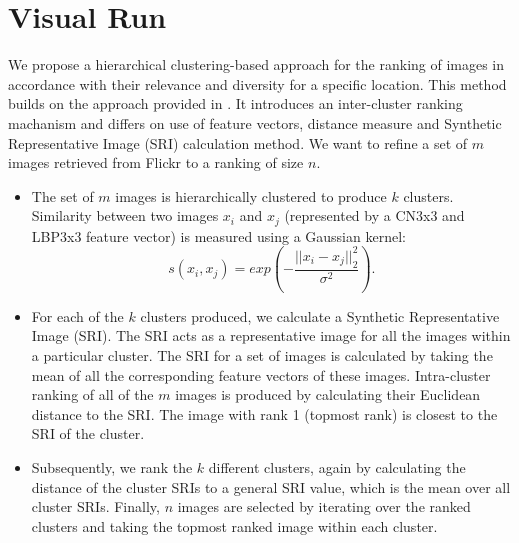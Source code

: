\documentclass{acm_proc_article-me11_tweaked}
\begin{document}
\section{Visual Run}
\label{visual-similarity}
We propose a hierarchical clustering-based approach for the ranking of images in accordance with their relevance and diversity for a specific location. 
This method builds on the approach provided in \cite{representativeness}.
It introduces an inter-cluster ranking machanism and differs on use of feature vectors, distance measure and Synthetic Representative Image (SRI) calculation method.
We want to refine a set of $m$ images retrieved from Flickr to a ranking of size $n$.
\begin{itemize}[leftmargin=*]
 \item The set of $m$ images is hierarchically clustered to produce $k$ clusters. Similarity between two images $x_i$ and $x_j$ (represented by a CN3x3 and LBP3x3 feature vector) is measured using a Gaussian kernel:
 \begin{equation}
 \label{gaussian-similarity}
s(x_i, x_j) = exp\left(-\frac{||x_i - x_j||_2^2}{\sigma^2}\right).
 \end{equation}
 
 \item For each of the $k$ clusters produced, we calculate a Synthetic Representative Image (SRI). 
The SRI acts as a representative image for all the images within a particular cluster. 
The SRI for a set of images is calculated by taking the mean of all the corresponding feature vectors of these images. 
Intra-cluster ranking of all of the $m$ images is produced by calculating their Euclidean distance to the SRI.
The image with rank 1 (topmost rank) is closest to the SRI of the cluster.
\item Subsequently, we rank the $k$ different clusters, again by calculating the distance of the cluster SRIs to a general SRI value, which is the mean over all cluster SRIs. 
Finally, $n$ images are selected by iterating over the ranked clusters and taking the topmost ranked image within each cluster. 

\end{itemize}
\end{document}
